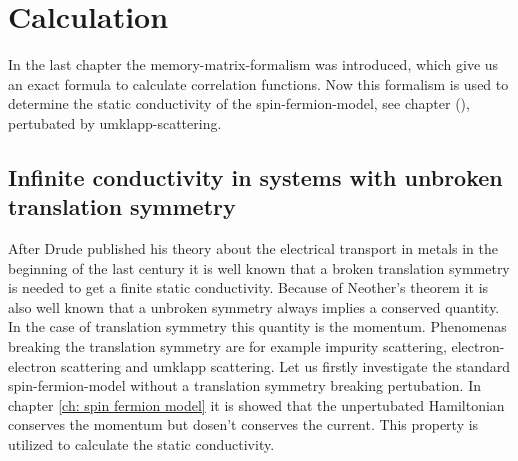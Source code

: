 %
%
%
\chapter{Calculation}
\label{ch: calculation}
%
%
%
In the last chapter the memory-matrix-formalism was introduced, which give us an exact formula to calculate correlation functions.
Now this formalism is used to determine the static conductivity of the spin-fermion-model, see chapter (), pertubated by umklapp-scattering.
%
%
\section{Infinite conductivity in systems with unbroken translation symmetry}
\label{sec: Infinite conductivity in a system with unbroken translation symmetry}
%
%
After Drude published his theory about the electrical transport in metals \cite{Drude} in the beginning of the last century it is well known that a broken translation symmetry is needed to get a finite static conductivity.
Because of Neother's theorem it is also well known that a unbroken symmetry always implies a conserved quantity.
In the case of translation symmetry this quantity is the momentum.
Phenomenas breaking the translation symmetry are for example impurity scattering, electron-electron scattering and umklapp scattering.
Let us firstly investigate the standard spin-fermion-model without a translation symmetry breaking pertubation.
In chapter \ref{ch: spin fermion model} it is showed that the unpertubated Hamiltonian conserves the momentum but dosen't conserves the current.
This property is utilized to calculate the static conductivity.

